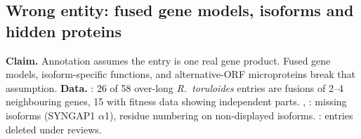 \subsection{Wrong entity: fused gene models, isoforms and hidden proteins}\label{sec:dd-entity}
\textbf{Claim.} Annotation assumes the entry is one real gene product. Fused gene models,
isoform-specific functions, and alternative-ORF microproteins break that assumption.
\textbf{Data.} : 26 of 58 over-long \textit{R.\ toruloides} entries
are fusions of 2--4 neighbouring genes, 15 with fitness data showing independent parts.
, : missing isoforms (SYNGAP1 $\alpha$1), residue
numbering on non-displayed isoforms. : entries deleted under reviews.
